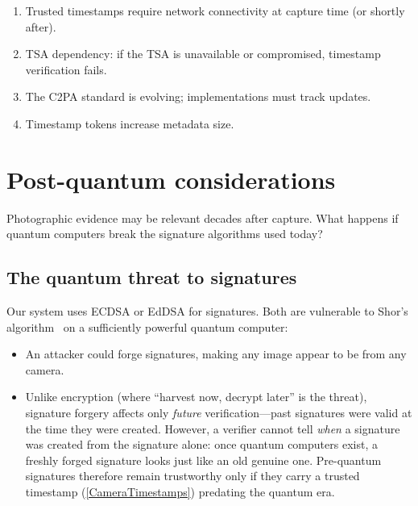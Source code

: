\begin{enumerate}
  \item Trusted timestamps require network connectivity at capture time (or 
    shortly after).
  \item TSA dependency: if the TSA is unavailable or compromised, timestamp 
    verification fails.
  \item The C2PA standard is evolving; implementations must track updates.
  \item Timestamp tokens increase metadata size.
\end{enumerate}


\section{Post-quantum considerations}\label{CameraPostQuantum}


\begin{exercise}
  Photographic evidence may be relevant decades after capture.
  What happens if quantum computers break the signature algorithms used today?
\end{exercise}

\subsection{The quantum threat to signatures}

Our system uses ECDSA or EdDSA for signatures.
Both are vulnerable to Shor's algorithm~\autocite{Shor1997} on a
sufficiently powerful quantum computer:
\begin{itemize}
  \item An attacker could forge signatures, making any image appear to be from 
    any camera.
  \item Unlike encryption (where \enquote{harvest now, decrypt later} is the
    threat), signature forgery affects only \emph{future} verification---past
    signatures were valid at the time they were created.
    However, a verifier cannot tell \emph{when} a signature was created from
    the signature alone: once quantum computers exist, a freshly forged
    signature looks just like an old genuine one.
    Pre-quantum signatures therefore remain trustworthy only if they carry a
    trusted timestamp (\cref{CameraTimestamps}) predating the quantum era.
\end{itemize}

